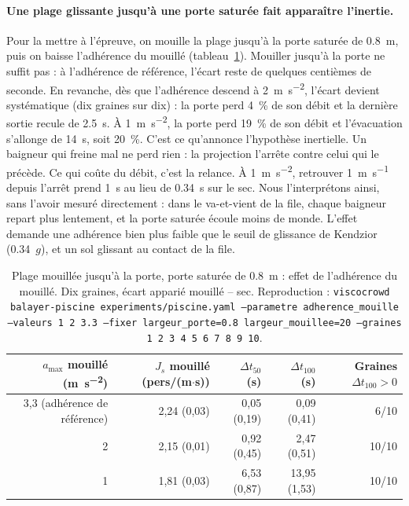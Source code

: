 \paragraph{Une plage glissante jusqu'à une porte saturée fait apparaître l'inertie.}
Pour la mettre à l'épreuve, on mouille la plage jusqu'à la porte saturée de
\SI{0.8}{\metre}, puis on baisse l'adhérence du mouillé (tableau~\ref{tab:e4-inertie}).
Mouiller jusqu'à la porte ne suffit pas : à l'adhérence de référence, l'écart reste de
quelques centièmes de seconde. En revanche, dès que l'adhérence descend à
\SI{2}{\metre\per\second\squared}, l'écart devient systématique (dix graines sur dix) :
la porte perd \SI{4}{\percent} de son débit et la dernière sortie recule de
\SI{2.5}{\second}. À \SI{1}{\metre\per\second\squared}, la porte perd \SI{19}{\percent}
de son débit et l'évacuation s'allonge de \SI{14}{\second}, soit \SI{20}{\percent}. C'est
ce qu'annonce l'hypothèse inertielle. Un baigneur qui freine mal ne perd rien : la projection
l'arrête contre celui qui le précède. Ce qui coûte du débit, c'est la relance. À
\SI{1}{\metre\per\second\squared}, retrouver \SI{1}{\metre\per\second} depuis l'arrêt prend
\SI{1}{\second} au lieu de \SI{0.34}{\second} sur le sec. Nous l'interprétons ainsi, sans
l'avoir mesuré directement : dans le va-et-vient de la file, chaque baigneur repart plus
lentement, et la porte saturée écoule moins de monde. L'effet demande une adhérence bien plus
faible que le seuil de glissance de Kendzior (\num{0.34}~$g$), et un sol glissant au contact
de la file.

\begin{table}[ht]
\centering
\caption{Plage mouillée jusqu'à la porte, porte saturée de \SI{0.8}{\metre} : effet de
l'adhérence du mouillé. Dix graines, écart apparié mouillé -- sec. Reproduction :
\texttt{viscocrowd balayer-piscine experiments/piscine.yaml --parametre adherence\_mouille
--valeurs 1 2 3.3 --fixer largeur\_porte=0.8 largeur\_mouillee=20 --graines 1 2 3 4 5 6 7 8 9
10}.}
\label{tab:e4-inertie}
\begin{tabular}{rrrrr}
\toprule
$a_{\max}$ mouillé (\si{\metre\per\second\squared}) & $J_s$ mouillé (pers/(m$\cdot$s)) &
$\Delta t_{50}$ (s) & $\Delta t_{100}$ (s) & Graines $\Delta t_{100}>0$ \\
\midrule
3,3 (adhérence de référence) & 2,24 (0,03) & 0,05 (0,19) & 0,09 (0,41) & 6/10 \\
2 & 2,15 (0,01) & 0,92 (0,45) & 2,47 (0,51) & 10/10 \\
1 & 1,81 (0,03) & 6,53 (0,87) & 13,95 (1,53) & 10/10 \\
\bottomrule
\end{tabular}
\end{table}


